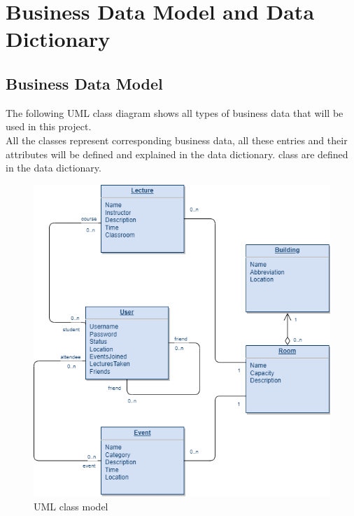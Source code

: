 \documentclass[12pt]{article}
\begin{document}
\section{Business Data Model and Data Dictionary}
\subsection{Business Data Model}

The following UML class diagram shows all types of business data that will be used in this project.\\
All the classes represent corresponding business data, all these entries and their attributes will be defined and explained in the data dictionary.
class are defined in the data dictionary.
\begin{figure}[H]
\begin{center}
\includegraphics[scale=0.5]{Business_Data_Model.png}
\end{center}
\caption{UML class model}
\end{figure}
\end{document}
